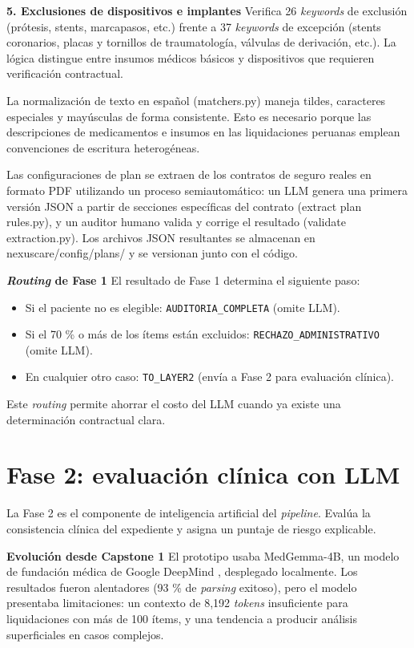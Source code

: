\noindent \textbf{5. Exclusiones de dispositivos e implantes} Verifica 26 \textit{keywords} de exclusión (prótesis, stents, marcapasos, etc.) frente a 37 \textit{keywords} de excepción (stents coronarios, placas y tornillos de traumatología, válvulas de derivación, etc.). La lógica distingue entre insumos médicos básicos y dispositivos que requieren verificación contractual.

La normalización de texto en español (matchers.py) maneja tildes, caracteres especiales y mayúsculas de forma consistente. Esto es necesario porque las descripciones de medicamentos e insumos en las liquidaciones peruanas emplean convenciones de escritura heterogéneas.

Las configuraciones de plan se extraen de los contratos de seguro reales en formato PDF utilizando un proceso semiautomático: un LLM genera una primera versión JSON a partir de secciones específicas del contrato (extract plan rules.py), y un auditor humano valida y corrige el resultado (validate extraction.py). Los archivos JSON resultantes se almacenan en nexuscare/config/plans/ y se versionan junto con el código.

\textbf{\textit{Routing} de Fase 1} El resultado de Fase 1 determina el siguiente paso:
\begin{itemize}
    \item Si el paciente no es elegible: \texttt{AUDITORIA\_COMPLETA} (omite LLM).
    \item Si el 70 \% o más de los ítems están excluidos: \texttt{RECHAZO\_ADMINISTRATIVO} (omite LLM).
    \item En cualquier otro caso: \texttt{TO\_LAYER2} (envía a Fase 2 para evaluación clínica).
\end{itemize}

Este \textit{routing} permite ahorrar el costo del LLM cuando ya existe una determinación contractual clara.

\section{Fase 2: evaluación clínica con LLM}

La Fase 2 es el componente de inteligencia artificial del \textit{pipeline}. Evalúa la consistencia clínica del expediente y asigna un puntaje de riesgo explicable.

\textbf{Evolución desde Capstone 1} El prototipo usaba MedGemma-4B, un modelo de fundación médica de Google DeepMind \cite{google2025medgemma}, desplegado localmente. Los resultados fueron alentadores (93 \% de \textit{parsing} exitoso), pero el modelo presentaba limitaciones: un contexto de 8,192 \textit{tokens} insuficiente para liquidaciones con más de 100 ítems, y una tendencia a producir análisis superficiales en casos complejos.

